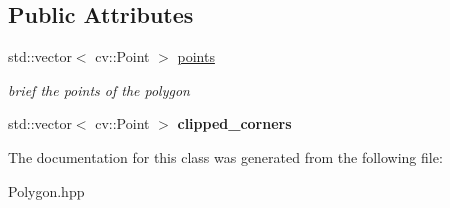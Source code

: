 \subsection*{Public Attributes}
\begin{DoxyCompactItemize}
\item 
\mbox{\label{class_geometry2_d_1_1_polygon_ab965e028324c2199022da00ff7eef14b}} 
std\+::vector$<$ cv\+::\+Point $>$ \mbox{\hyperlink{class_geometry2_d_1_1_polygon_ab965e028324c2199022da00ff7eef14b}{points}}
\begin{DoxyCompactList}\small\item\em brief the points of the polygon \end{DoxyCompactList}\item 
\mbox{\label{class_geometry2_d_1_1_polygon_a4260f5b694569381beb42bc9a1fffbcd}} 
std\+::vector$<$ cv\+::\+Point $>$ {\bfseries clipped\+\_\+corners}
\end{DoxyCompactItemize}


The documentation for this class was generated from the following file\+:\begin{DoxyCompactItemize}
\item 
Polygon.\+hpp\end{DoxyCompactItemize}
